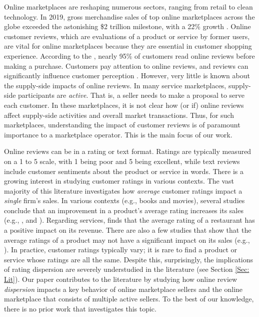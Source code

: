 \documentclass[mnsc,blindrev]{informs3}
\begin{document}
	
	Online marketplaces are reshaping numerous sectors, ranging from retail to clean technology. In 2019, gross merchandise sales of top online marketplaces across the globe exceeded the astonishing \$2 trillion milestone, with a 22\% growth \citep{onlinemarket}. Online customer reviews, which are evaluations of a product or service by former users, are vital for online marketplaces because they are essential in customer shopping experience. According to the \cite{Northwestern}, nearly 95\% of customers read online reviews before making a purchase.
	Customers pay attention to online reviews, and reviews can significantly influence customer perception \citep{askalidis2016value,reviewmatter}. However, very little is known about the supply-side impacts of online reviews. In many service marketplaces, supply-side participants are \emph{active}. That is, a seller needs to make a proposal to serve each customer. In these marketplaces, it is not clear how (or if) online reviews affect supply-side activities and overall market transactions. Thus, for such marketplaces, understanding the impact of customer reviews is of paramount importance to a marketplace operator. This is the main focus of our work.
	
	
	Online reviews can be in a rating or text format. Ratings are typically measured on a 1 to 5 scale, with 1 being poor and 5 being excellent, while text reviews include customer sentiments about the product or service in words.  There is a growing interest in studying customer ratings in various contexts. The vast majority of this literature investigates how \emph{average} customer ratings impact a \emph{single} firm's sales. In various contexts (e.g., books and movies), several studies conclude that an improvement in a product's average rating increases its sales (e.g., \cite{chevalier2006effect}, \cite{chintagunta2010effects} and \cite{deshpan19logistic}). Regarding services, \cite{luca2016reviews} finds that the average rating of a restaurant has a positive impact on its revenue. There are also a few studies that show that the average ratings of a product may not have a significant impact on its sales (e.g., \cite{duan2008online}).  In practice, customer ratings typically vary; it is rare to find a product or service whose ratings are all the same. Despite this, surprisingly, the implications of rating dispersion are severely understudied in the literature (see Section \ref{Sec: Lit}). Our paper contributes to the literature by studying how online review \emph{dispersion} impacts  a key behavior of online marketplace sellers and the online marketplace that consists of multiple active sellers. To the best of our knowledge, there is no prior work that investigates this topic.
	
\end{document}
